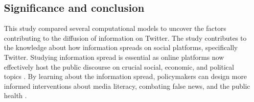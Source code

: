 \documentclass[11pt,a4paper]{article}
\begin{document}
    \subsection{Significance and conclusion}
    This study compared several computational models to uncover the factors contributing to the diffusion of information on Twitter. The study contributes to the knowledge about how information spreads on social platforms, specifically Twitter. Studying information spread is essential as online platforms now effectively host the public discourse on crucial social, economic, and political topics \cite{lorenz-spreen_how_2020}. By learning about the information spread, policymakers can design more informed interventions about media literacy, combating false news, and the public health \cite{edo-osagie_scoping_2020}.

\clearpage
\printbibliography

\end{document}

